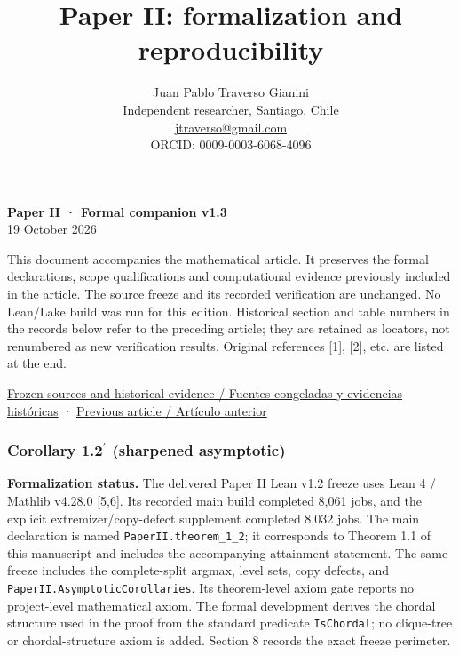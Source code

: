 \documentclass[english,11pt,a4paper]{article}
\title{Paper II: formalization and reproducibility}
\author{Juan Pablo Traverso Gianini\\\small Independent researcher, Santiago, Chile\\\small \href{mailto:jtraverso@gmail.com}{jtraverso@gmail.com}\\\small ORCID: 0009-0003-6068-4096}
\date{}
\begin{document}
\raggedbottom
\maketitle
\textbf{Paper II · Formal companion v1.3}\\
19 October 2026

This document accompanies the mathematical article. It preserves the
formal declarations, scope qualifications and computational evidence
previously included in the article. The source freeze and its recorded
verification are unchanged. No Lean/Lake build was run for this edition.
Historical section and table numbers in the records below refer to the
preceding article; they are retained as locators, not renumbered as new
verification results. Original references {[}1{]}, {[}2{]}, etc. are
listed at the end.

\href{https://github.com/jtraverso/erdos-81-chordal-clique-partitions/tree/eb335845bfa23375d5040ea31fc4f4b366346287/preprints/PAPER_II/05_formalization}{Frozen
sources and historical evidence / Fuentes congeladas y evidencias
históricas} ·
\href{https://github.com/jtraverso/erdos-81-chordal-clique-partitions/tree/eb335845bfa23375d5040ea31fc4f4b366346287/preprints/PAPER_II/01_manuscript}{Previous
article / Artículo anterior}

\subsubsection{\texorpdfstring{Corollary 1.2\(^{\prime}\) (sharpened
asymptotic)}{Corollary 1.2\^{}\{\textbackslash prime\} (sharpened asymptotic)}}\label{corollary-1.2prime-sharpened-asymptotic}

\textbf{Formalization status.} The delivered Paper II Lean v1.2 freeze
uses Lean 4 / Mathlib v4.28.0 {[}5,6{]}. Its recorded main build
completed 8,061 jobs, and the explicit extremizer/copy-defect supplement
completed 8,032 jobs. The main declaration is named
\nolinkurl{PaperII.theorem_1_2}; it corresponds to Theorem 1.1 of this
manuscript and includes the accompanying attainment statement. The same
freeze includes the complete-split argmax, level sets, copy defects, and
\nolinkurl{PaperII.AsymptoticCorollaries}. Its theorem-level axiom gate
reports no project-level mathematical axiom. The formal development
derives the chordal structure used in the proof from the standard
predicate \nolinkurl{IsChordal}; no clique-tree or chordal-structure axiom
is added. Section 8 records the exact freeze perimeter.
\end{document}
